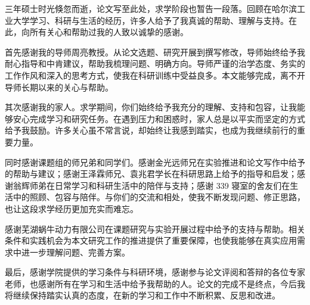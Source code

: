 \begin{acknowledgements}
三年硕士时光倏忽而逝，论文写至此处，求学阶段也暂告一段落。回顾在哈尔滨工业大学学习、科研与生活的经历，许多人给予了我真诚的帮助、理解与支持。在此，向所有关心和帮助过我的人致以诚挚的感谢。

首先感谢我的导师周亮教授。从论文选题、研究开展到撰写修改，导师始终给予我耐心指导和中肯建议，帮助我梳理问题、明确方向。导师严谨的治学态度、务实的工作作风和深入的思考方式，使我在科研训练中受益良多。本文能够完成，离不开导师长期以来的关心与帮助。

其次感谢我的家人。求学期间，你们始终给予我充分的理解、支持和包容，让我能够安心完成学习和研究任务。在遇到压力和困惑时，家人总是以平实而坚定的方式给予我鼓励。许多关心虽不常言说，却始终让我感到踏实，也成为我继续前行的重要力量。

同时感谢课题组的师兄弟和同学们。感谢金光远师兄在实验推进和论文写作中给予的帮助与建议；感谢王泽霖师兄、袁兆君学长在科研思路上给予的指导和启发；感谢翁辉师弟在日常学习和科研生活中的陪伴与支持；感谢 339 寝室的舍友们在生活中的照顾、包容与陪伴。与你们的交流和相处，使我不断发现问题、修正思路，也让这段求学经历更加充实而难忘。

感谢芜湖蜗牛动力有限公司在课题研究与实验开展过程中给予的支持与帮助。相关条件和实践机会为本文研究工作的推进提供了重要保障，也使我能够在真实应用需求中进一步理解问题、完善方案。

最后，感谢学院提供的学习条件与科研环境，感谢参与论文评阅和答辩的各位专家老师，也感谢所有在学习和生活中给予我帮助的人。论文的完成不是终点，今后我将继续保持踏实认真的态度，在新的学习和工作中不断积累、反思和改进。

\end{acknowledgements}
